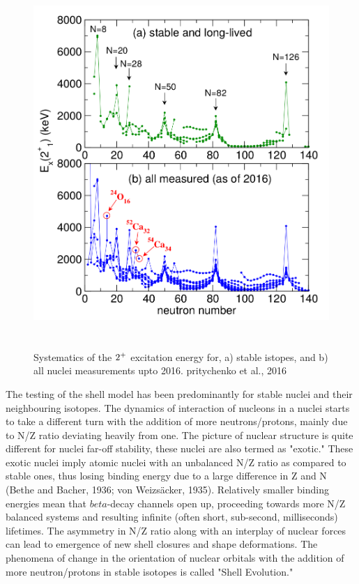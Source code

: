 \documentclass[a4paper,12pt,twoside]{report}
\begin{document}
\begin{figure}[h!]
    \centering
    \includegraphics[width=14cm,height=14cm]{be2_n_50.png}
    \caption[Systematic of ]{Systematics of the $2\textsuperscript{+}$ excitation energy for, a) stable istopes, and b) all nuclei measurements upto 2016. pritychenko et al., 2016 }
    \label{fig:2_plus_excitation}
\end{figure}

The testing of the shell model has been predominantly for stable nuclei and their neighbouring isotopes. The dynamics of interaction of nucleons in a nuclei starts to take a different turn with the addition of more neutrons/protons, mainly due to N/Z ratio deviating heavily from one. The picture of nuclear structure is quite different for nuclei far-off stability, these nuclei are also termed as "exotic." These exotic nuclei imply atomic nuclei with an unbalanced N/Z ratio as compared to stable ones, thus losing binding energy due to a large difference in Z and N (Bethe and Bacher, 1936; von Weizsäcker, 1935). Relatively smaller binding energies mean that $beta$-decay channels open up, proceeding towards more N/Z balanced systems and resulting infinite (often short, sub-second, milliseconds) lifetimes. The asymmetry in N/Z ratio along with an interplay of nuclear forces can lead to emergence of new shell closures and shape deformations. The phenomena of change in the orientation of nuclear orbitals with the addition of more neutron/protons in stable isotopes is called "Shell Evolution." 
\end{document}
